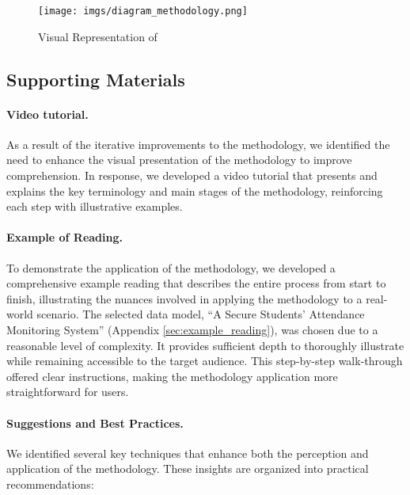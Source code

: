\begin{figure}[t]
  \centering
  \texttt{[image: imgs/diagram\_methodology.png]}
  \caption{Visual Representation of \credal}
  \label{fig:close_reading_pipeline}
\end{figure}


\subsection{Supporting Materials}
\label{sec:credal:supp}

\paragraph{Video tutorial.} As a result of the iterative improvements to the methodology, we identified the need to enhance the visual presentation of the methodology to improve comprehension. In response, we developed a video tutorial that presents and explains the key terminology and main stages of the methodology, reinforcing each step with illustrative examples. 

\paragraph{Example of Reading.} To demonstrate the application of the methodology, we developed a comprehensive example reading that describes the entire process from start to finish, illustrating the nuances involved in applying the methodology to a real-world scenario. The selected data model, ``A Secure Students’ Attendance Monitoring System'' (Appendix \ref{sec:example_reading}), was chosen due to a reasonable level of complexity. It provides sufficient depth to thoroughly illustrate \credal while remaining accessible to the target audience. This step-by-step walk-through offered clear instructions, making the methodology application more straightforward for users.

\paragraph{Suggestions and Best Practices.} We identified several key techniques that enhance both the perception and application of the methodology. These insights are organized into practical recommendations:

